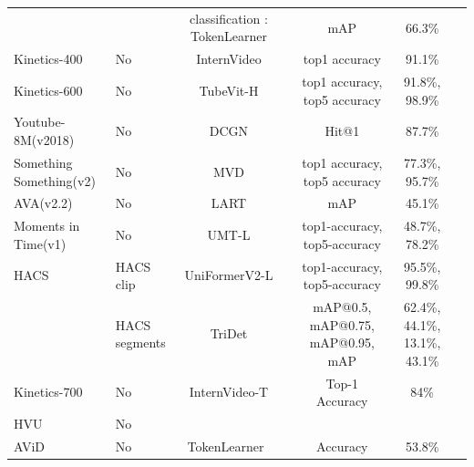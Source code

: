 \documentclass[a4paper]{article}
\begin{document}
\begin{table}
\begin{tabular}{l|l|c c c c c}
		                        &               & classification : TokenLearner & \cite{TokenLearner}  & mAP                                            & 66.3\%       \\
		Kinetics-400            & No            & InternVideo                   & \cite{InternVideo}   & top1 accuracy                                  & 91.1\%                                       \\
		Kinetics-600            & No            & TubeVit-H                     & \cite{TubeVit-H}     & top1 accuracy, top5 accuracy                   & 91.8\%, 98.9\%	                                     \\
		Youtube-8M(v2018)       & No            & DCGN                          & \cite{DCGN}          & Hit@1                                          & 87.7\%                                                     \\
		Something Something(v2) & No            & MVD                           & \cite{MVD}           & top1 accuracy, top5 accuracy                   & 77.3\%, 95.7\%            \\
		AVA(v2.2)               & No            & LART                          & \cite{LART}          & mAP                                            & 45.1\%          \\
		Moments in Time(v1)     & No            & UMT-L                         & \cite{UMT-L}         & top1-accuracy, top5-accuracy                   & 48.7\%, 78.2\%                                    \\
		HACS                    & HACS clip     & UniFormerV2-L                 & \cite{UniFormerV2-L} & top1-accuracy, top5-accuracy                   & 95.5\%, 99.8\%                                             \\
								& HACS segments & TriDet                        & \cite{TriDet}        & mAP@0.5, mAP@0.75, mAP@0.95, mAP               & 62.4\%, 44.1\%, 13.1\%, 43.1\%              \\
		Kinetics-700            & No            & InternVideo-T                 & \cite{InternVideo}   & Top-1 Accuracy                                 & 84\%                                              \\
		HVU                     & No            &                               &                      &                                                &                                                 \\
		AViD                    & No            & TokenLearner                  & \cite{TokenLearner}  & Accuracy                                       & 53.8\%                                              \\

\end{tabular}
\end{table}
\end{document}
